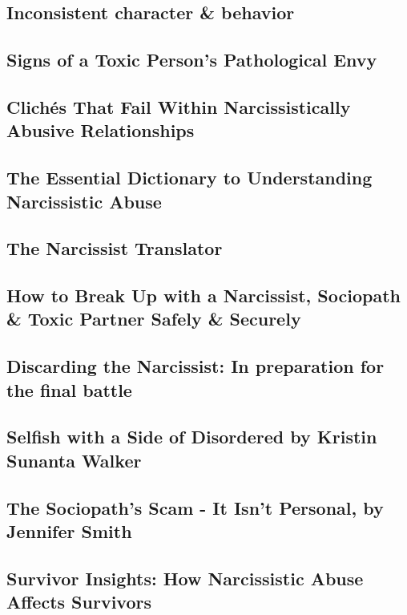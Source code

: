\documentclass[oneside]{book}
\numberwithin{equation}{section}
\begin{document}
\subsection{Inconsistent character \& behavior}

\subsection{Signs of a Toxic Person's Pathological Envy}

\subsection{Clich\'es That Fail Within Narcissistically Abusive Relationships}

\subsection{The Essential Dictionary to Understanding Narcissistic Abuse}

\subsection{The Narcissist Translator}

\subsection{How to Break Up with a Narcissist, Sociopath \& Toxic Partner Safely \& Securely}

\subsection{Discarding the Narcissist: In preparation for the final battle}

\subsection{Selfish with a Side of Disordered by Kristin Sunanta Walker}

\subsection{The Sociopath's Scam - It Isn't Personal, by Jennifer Smith}

\subsection{Survivor Insights: How Narcissistic Abuse Affects Survivors}
\end{document}
